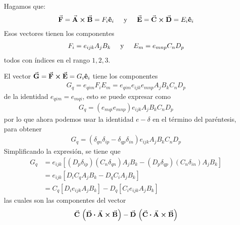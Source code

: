 \documentclass[hidelinks,12pt]{article}
\begin{document}
Hagamos que:
\begin{align*}
    \va{F} = \va{A} \cross \va{B} = F_{i} \vu{e}_{i} \hspace{0.5cm} \text{y} \hspace{0.5cm} \va{E} = \va{C} \cross \va{D} = E_{i} \vu{e}_{i}
\end{align*}
Esos vectores tienen los componentes
\begin{align*}
    F_{i} = e_{ijk} A_{j} B_{k} \hspace{0.5cm} \text{y} \hspace{0.5cm} E_{m} = e_{mnp} C_{n} D_{p}
\end{align*}
todos con índices en el rango $1, 2, 3$.
\par
El vector $\va{G} = \va{F} \cross \va{E} = G_{i} \vu{e}_{i}$ tiene los componentes
\begin{align*}
    G_{q} = e_{qim} F_{i} E_{m} = e_{qim} e_{ijk} e_{mnp} A_{j} B_{k} C_{n} D_{p}
\end{align*}
de la identidad $e_{qim} = e_{mqi}$, esto se puede expresar como
\begin{align*}
    G_{q} = \left( e_{mqi} e_{mnp} \right) e_{ijk} A_{j} B_{k} C_{n} D_{p}
\end{align*}
por lo que ahora podemos usar la identidad $e-\delta$ en el término del paréntesis, para obtener
\begin{align*}
    G_{q} = \left( \delta_{qn} \delta_{ip} - \delta_{qp} \delta_{in} \right) e_{ijk} A_{j} B_{k} C_{n} D_{p}
\end{align*}
Simplificando la expresión, se tiene que
\begin{align*}
    G_{q} &= e_{ijk} \left[ \left( D_{p} \delta_{ip} \right) \left( C_{n} \delta_{qn} \right) A_{j} B_{k} - \left( D_{p} \delta_{qp} \right) \left( C_{n} \delta_{in} \right) A_{j} B_{k} \right] \\
    &= e_{ijk} \left[ D_{i} C_{q} A_{j} B_{k} - D_{q} C_{i} A_{j} B_{k} \right] \\
    &= C_{q} \left[ D_{i} e_{ijk} A_{j} B_{k} \right] - D_{q} \left[ C_{i} e_{ijk} A_{j} B_{k} \right]
\end{align*}
las cuales son las componentes del vector
\begin{align*}
    \va{C} \, \left( \va{D} \vdot \va{A} \cross \va{B} \right) - \va{D} \, \left( \va{C} \vdot \va{A} \cross \va{B} \right)
\end{align*}
\end{document}

